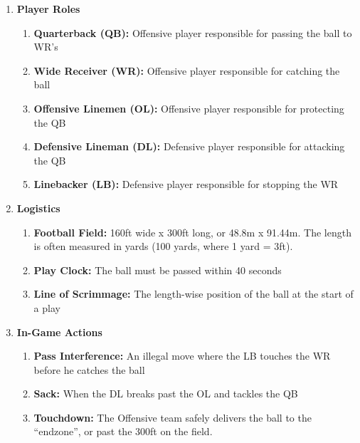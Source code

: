 \begin{enumerate}
    \item \textbf{Player Roles}
        \begin{enumerate}
            \item \textbf{Quarterback (QB):} Offensive player responsible for passing the ball to WR’s
            \item \textbf{Wide Receiver (WR):} Offensive player responsible for catching the ball 
            \item \textbf{Offensive Linemen (OL):} Offensive player responsible for protecting the QB 
            \item \textbf{Defensive Lineman (DL):} Defensive player responsible for attacking the QB
            \item \textbf{Linebacker (LB):} Defensive player responsible for stopping the WR
        \end{enumerate}
    \item \textbf{Logistics}
        \begin{enumerate}
            \item \textbf{Football Field:} 160ft wide x 300ft long, or 48.8m x 91.44m. The length is often measured in yards (100 yards, where 1 yard = 3ft). 
            \item \textbf{Play Clock:} The ball must be passed within 40 seconds
            \item \textbf{Line of Scrimmage:} The length-wise position of the ball at the start of a play
        \end{enumerate}
    \item \textbf{In-Game Actions}
        \begin{enumerate}
            \item \textbf{Pass Interference:} An illegal move where the LB touches the WR before he catches the ball 
            \item \textbf{Sack:} When the DL breaks past the OL and tackles the QB
            \item \textbf{Touchdown:} The Offensive team safely delivers the ball to the “endzone”, or past the 300ft on the field.

        \end{enumerate}
\end{enumerate}